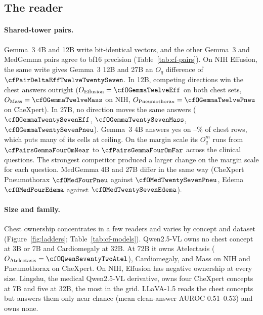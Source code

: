 \subsection{The reader}
\label{app:cf-reader}

\paragraph{Shared-tower pairs.} Gemma~3 4B and 12B write bit-identical vectors, and the other Gemma~3 and MedGemma pairs agree to bf16 precision (Table~\ref{tab:cf-pairs}). On NIH Effusion, the same write gives Gemma~3 12B and 27B an $O_q$ difference of $\cfPairDeltaEffTwelveTwentySeven$. In 12B, competing directions win the chest answers outright ($O_{\mathrm{Effusion}}=\cfOGemmaTwelveEff$ on both chest sets, $O_{\mathrm{Mass}}=\cfOGemmaTwelveMass$ on NIH, $O_{\mathrm{Pneumothorax}}=\cfOGemmaTwelvePneu$ on CheXpert). In 27B, no direction moves the same answers ($\cfOGemmaTwentySevenEff$, $\cfOGemmaTwentySevenMass$, $\cfOGemmaTwentySevenPneu$). Gemma~3 4B answers yes on \cfGemmaFourYesMin--\cfGemmaFourYesMax\% of chest rows, which puts many of its cells at ceiling. On the margin scale its $O^m_q$ runs from $\cfPairsGemmaFourOmNear$ to $\cfPairsGemmaFourOmFar$ across the clinical questions. The strongest competitor produced a larger change on the margin scale for each question. MedGemma 4B and 27B differ in the same way (CheXpert Pneumothorax $\cfOMedFourPneu$ against $\cfOMedTwentySevenPneu$, Edema $\cfOMedFourEdema$ against $\cfOMedTwentySevenEdema$).



\paragraph{Size and family.} Chest ownership concentrates in a few readers and varies by concept and dataset (Figure~\ref{fig:ladders}; Table~\ref{tab:cf-models}). Qwen2.5-VL owns no chest concept at 3B or 7B and Cardiomegaly at 32B. At 72B it owns Atelectasis ($O_{\mathrm{Atelectasis}}=\cfOQwenSeventyTwoAtel$), Cardiomegaly, and Mass on NIH and Pneumothorax on CheXpert. On NIH, Effusion has negative ownership at every size. Lingshu, the medical Qwen2.5-VL derivative, owns four CheXpert concepts at 7B and five at 32B, the most in the grid. LLaVA-1.5 reads the chest concepts but answers them only near chance (mean clean-answer AUROC 0.51--0.53) and owns none.

